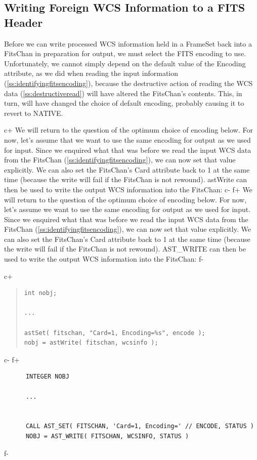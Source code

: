 \documentclass[twoside,11pt]{article}
\newcommand{\secref}[1]{\S\ref{#1}}
\renewcommand{\secref}[1]{\ref{#1}}
\begin{document}
\subsection{\label{ss:writingforeignfits}Writing Foreign WCS Information to a FITS Header}

Before we can write processed WCS information held in a FrameSet back
into a FitsChan in preparation for output, we must select the FITS
encoding to use.  Unfortunately, we cannot simply depend on the
default value of the Encoding attribute, as we did when reading the
input information (\secref{ss:identifyingfitsencoding}), because the
destructive action of reading the WCS data
(\secref{ss:destructiveread}) will have altered the FitsChan's
contents. This, in turn, will have changed the choice of default
encoding, probably causing it to revert to NATIVE.

c+
We will return to the question of the optimum choice of encoding
below.  For now, let's assume that we want to use the same encoding
for output as we used for input. Since we enquired what that was
before we read the input WCS data from the FitsChan
(\secref{ss:identifyingfitsencoding}), we can now set that value
explicitly. We can also set the FitsChan's Card attribute back to 1 at
the same time (because the write will fail if the FitsChan is not
rewound). astWrite can then be used to write the output WCS
information into the FitsChan:
c-
f+
We will return to the question of the optimum choice of encoding
below.  For now, let's assume we want to use the same encoding for
output as we used for input. Since we enquired what that was before we
read the input WCS data from the FitsChan
(\secref{ss:identifyingfitsencoding}), we can now set that value
explicitly. We can also set the FitsChan's Card attribute back to 1 at
the same time (because the write will fail if the FitsChan is not
rewound). AST\_WRITE can then be used to write the output WCS
information into the FitsChan:
f-

c+
\begin{quote}
\small
\begin{verbatim}
int nobj;

...

astSet( fitschan, "Card=1, Encoding=%s", encode );
nobj = astWrite( fitschan, wcsinfo );
\end{verbatim}
\normalsize
\end{quote}
c-
f+
\small
\begin{verbatim}
      INTEGER NOBJ

      ...


      CALL AST_SET( FITSCHAN, 'Card=1, Encoding=' // ENCODE, STATUS )
      NOBJ = AST_WRITE( FITSCHAN, WCSINFO, STATUS )
\end{verbatim}
\normalsize
f-
\end{document}
